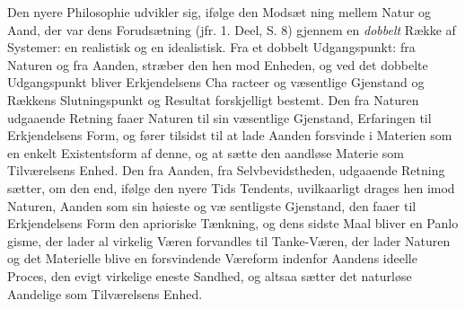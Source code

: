 \documentclass[12pt,a4paper]{book}
\begin{document}
Den nyere Philosophie udvikler sig, ifølge den Modsæt\-%
ning mellem Natur og Aand, der var dens Forudsætning (jfr.
1. Deel, S. 8) gjennem en \emph{dobbelt} Række af Systemer: en
realistisk og en idealistisk. Fra et dobbelt Udgangspunkt: fra
Naturen og fra Aanden, stræber den hen mod Enheden, og
ved det dobbelte Udgangspunkt bliver Erkjendelsens Cha\-%
racteer og væsentlige Gjenstand og Rækkens Slutningspunkt
og Resultat forskjelligt bestemt. Den fra Naturen udgaaende
Retning faaer Naturen til sin væsentlige Gjenstand, Erfaringen
til Erkjendelsens Form, og fører tilsidst til at lade Aanden
forsvinde i Materien som en enkelt Existentsform af denne, og
at sætte den aandløse Materie som Tilværelsens Enhed. Den
fra Aanden, fra Selvbevidstheden, udgaaende Retning sætter,
om den end, ifølge den nyere Tids Tendents, uvilkaarligt
drages hen imod Naturen, Aanden som sin høieste og væ\-%
sentligste Gjenstand, den faaer til Erkjendelsens Form den
aprioriske Tænkning, og dens sidste Maal bliver en Panlo\-%
gisme, der lader al virkelig Væren forvandles til Tanke-Væren,
der lader Naturen og det Materielle blive en forsvindende
Væreform indenfor Aandens ideelle Proces, den evigt virkelige
eneste Sandhed, og altsaa sætter det naturløse Aandelige som
Tilværelsens Enhed.
\end{document}
